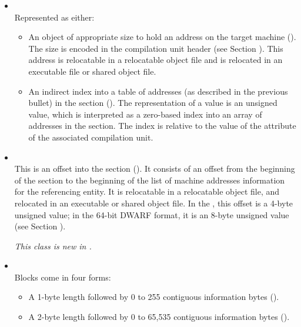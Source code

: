 \begin{itemize}
\item {} \\
Represented as either:
\begin{itemize}
\item An object of appropriate size to hold an
address on the target machine 
(\DWFORMaddrTARG). 
The size is encoded in the compilation unit header 
(see Section ).
This address is relocatable in a relocatable object file and
is relocated in an executable file or shared object file.

\item An indirect index into a table of addresses (as 
described in the previous bullet) in the
\dotdebugaddr{} section (\DWFORMaddrxTARG). 
The representation of a \DWFORMaddrxNAME{} value is an unsigned
 value, which is interpreted as a zero-based 
index into an array of addresses in the \dotdebugaddr{} section.
The index is relative to the value of the \DWATaddrbase{} attribute 
of the associated compilation unit.

\end{itemize}

\item {} \\
This is an offset into the \dotdebugaddr{} section (\DWFORMsecoffset). It
consists of an offset from the beginning of the \dotdebugaddr{} section to the
beginning of the list of machine addresses information for the
referencing entity. It is relocatable in
a relocatable object file, and relocated in an executable or
shared object file. In the \thirtytwobitdwarfformat, this offset
is a 4-byte unsigned value; in the 64-bit DWARF
format, it is an 8-byte unsigned value (see Section
).

\textit{This class is new in \DWARFVersionV.}

\item {} \\
Blocks come in four forms:
\begin{itemize}
\item
A 1-byte length followed by 0 to 255 contiguous information
bytes (\DWFORMblockoneTARG).

\item
A 2-byte length followed by 0 to 65,535 contiguous information
bytes (\DWFORMblocktwoTARG).


\end{itemize}
\end{itemize}
